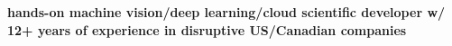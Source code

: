 \onehalfspace
\textbf{\large hands-on machine vision/deep learning/cloud scientific developer w/ 12+ years of experience in disruptive US/Canadian companies}
\singlespace

\vspace{0.8cm}
